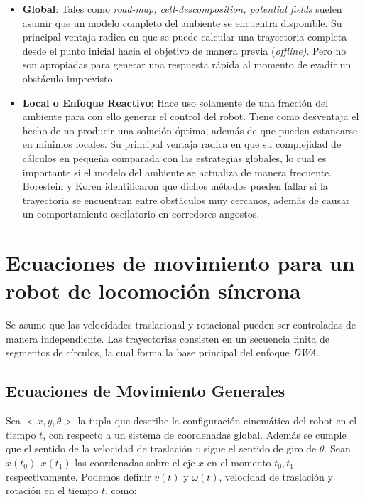 \documentclass[10pt]{article}
\begin{document}
\begin{itemize}[noitemsep]

	\item \textbf{Global}: Tales como \emph{road-map, cell-descomposition, potential fields} suelen asumir que un modelo completo del ambiente se encuentra disponible. Su principal ventaja radica en que se puede calcular una trayectoria completa desde el punto inicial hacia el objetivo de manera previa (\emph{offline)}. Pero no son apropiadas para generar una respuesta rápida al momento de evadir un obstáculo imprevisto.
	
	\item \textbf{Local o Enfoque Reactivo}: Hace uso solamente de una fracción del ambiente para con ello generar el control del robot. Tiene como desventaja el hecho de no producir una solución óptima, además de que pueden estancarse en mínimos locales. Su principal ventaja radica en que su complejidad de cálculos en pequeña comparada con las estrategias globales, lo cual es importante si el modelo del ambiente se actualiza de manera frecuente. Borestein y Koren \cite{koren1991potential} identificaron que dichos métodos pueden fallar si la trayectoria se encuentran entre obstáculos muy cercanos, además de causar un comportamiento oscilatorio en corredores angostos.
		
\end{itemize}






\section{Ecuaciones de movimiento para un robot de locomoción síncrona}

Se asume que las velocidades traslacional y rotacional pueden ser controladas de manera independiente. Las trayectorias consisten en un secuencia finita de segmentos de círculos, la cual forma la base principal del enfoque \emph{DWA}.

\subsection*{Ecuaciones de Movimiento Generales}

Sea $<x, y, \theta>$ la tupla que describe la configuración cinemática del robot en el tiempo $t$, con respecto a un sistema de coordenadas global. Además se cumple que el sentido de la velocidad de traslación $v$ sigue el sentido de giro de $\theta$. Sean $x(t_0), x(t_1)$ las coordenadas sobre el eje $x$ en el momento $t_0, t_1$ respectivamente. Podemos definir $v(t)$ y $\omega(t)$, velocidad de traslación y rotación en el tiempo $t$, como:
\end{document}
